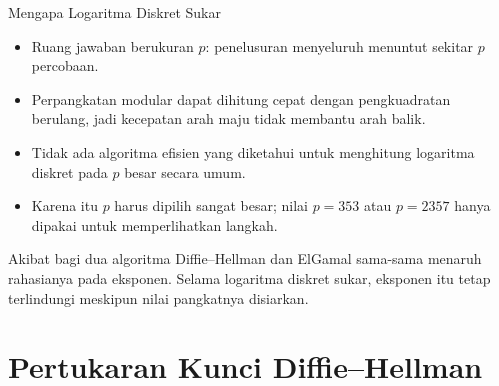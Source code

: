 \documentclass[aspectratio=169,11pt]{beamer}
\begin{document}
\begin{frame}{Mengapa Logaritma Diskret Sukar}
    \footnotesize
    \begin{itemize}
        \item Ruang jawaban berukuran $p$: penelusuran menyeluruh menuntut
              sekitar $p$ percobaan.
        \item Perpangkatan modular dapat dihitung cepat dengan pengkuadratan
              berulang, jadi kecepatan arah maju tidak membantu arah balik.
        \item Tidak ada algoritma efisien yang diketahui untuk menghitung
              logaritma diskret pada $p$ besar secara umum.
        \item Karena itu $p$ harus dipilih sangat besar; nilai $p = 353$
              atau $p = 2357$ hanya dipakai untuk memperlihatkan langkah.
    \end{itemize}
    \vspace{0.1cm}
    \begin{exampleblock}{Akibat bagi dua algoritma}
        \footnotesize
        Diffie--Hellman dan ElGamal sama-sama menaruh rahasianya pada
        eksponen. Selama logaritma diskret sukar, eksponen itu tetap
        terlindungi meskipun nilai pangkatnya disiarkan.
    \end{exampleblock}
\end{frame}

\section{Pertukaran Kunci Diffie--Hellman}
\end{document}
